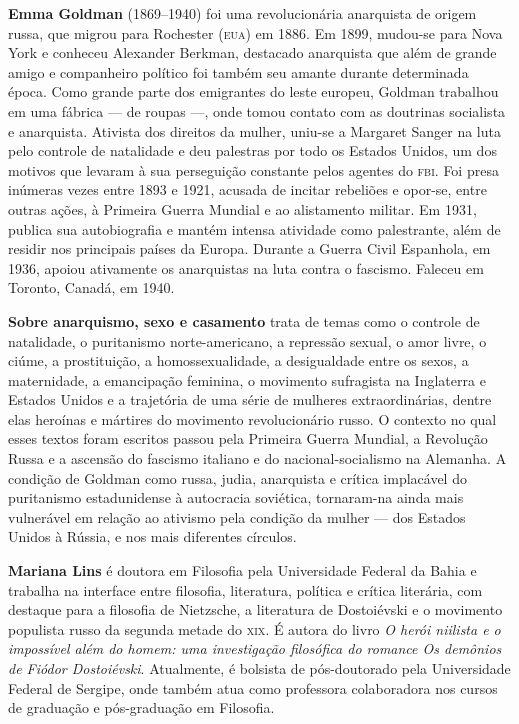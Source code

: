 \textbf{Emma Goldman} (1869–1940) foi uma revolucionária anarquista de origem russa, que migrou para Rochester (\textsc{eua}) em 1886. Em 1899, mudou-se para Nova York e conheceu Alexander Berkman, destacado anarquista que além de grande amigo e companheiro político foi também seu amante durante determinada época. Como grande parte dos emigrantes do leste europeu, Goldman trabalhou em uma fábrica --- de roupas ---, onde tomou contato com as doutrinas socialista e anarquista. Ativista dos direitos da mulher, uniu-se a Margaret Sanger na luta pelo controle de natalidade e deu palestras por todo os Estados Unidos, um dos motivos que levaram à sua perseguição constante pelos agentes do \textsc{fbi}. Foi presa inúmeras vezes entre 1893 e 1921, acusada de incitar rebeliões e opor-se, entre outras ações, à Primeira Guerra Mundial e ao alistamento militar. Em 1931, publica sua autobiografia e mantém intensa atividade como palestrante, além de residir nos principais países da Europa. Durante a Guerra Civil Espanhola, em 1936, apoiou ativamente os anarquistas na luta contra o fascismo. Faleceu em Toronto, Canadá, em 1940.

\textbf{Sobre anarquismo, sexo e casamento} trata de temas como o controle de natalidade, o puritanismo norte-americano, a repressão sexual, o amor livre, o ciúme, a prostituição, a homossexualidade, a desigualdade entre os sexos, a maternidade, a emancipação feminina, o movimento sufragista na Inglaterra e Estados Unidos e a trajetória de uma série de mulheres extraordinárias, dentre elas heroínas e mártires do movimento revolucionário russo. O contexto no qual esses textos foram escritos passou pela Primeira Guerra Mundial, a Revolução Russa e a ascensão do fascismo italiano e do nacional-socialismo na Alemanha. A condição de Goldman como russa, judia, anarquista e crítica implacável do puritanismo estadunidense à autocracia soviética, tornaram-na ainda mais vulnerável em relação ao ativismo pela condição da mulher --- dos Estados Unidos à Rússia, e nos mais diferentes círculos.

\textbf{Mariana Lins} é doutora em Filosofia pela Universidade Federal da Bahia e trabalha na interface entre filosofia, literatura, política e crítica literária, com destaque para a filosofia de Nietzsche, a literatura de Dostoiévski e o movimento populista russo da segunda metade do \textsc{xix}. É autora do livro \textit{O herói niilista e o impossível além do homem: uma investigação filosófica do romance \emph{Os demônios} de Fiódor Dostoiévski}. Atualmente, é bolsista de pós-doutorado pela Universidade Federal de Sergipe, onde também atua como professora colaboradora nos cursos de graduação e pós-graduação em Filosofia.




